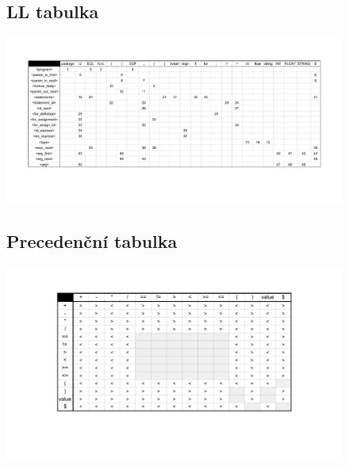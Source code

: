 \documentclass[a4paper, 12pt]{article}
\def\fillandplacepagenumber{%
 \par\pagestyle{empty}%
 \vbox to 0pt{\vss}\vfill
 \vbox to 0pt{\baselineskip0pt
   \hbox to\linewidth{\hss}%
   \baselineskip\footskip
   \hbox to\linewidth{%
     \hfil\thepage\hfil}\vss}}
\begin{document}
\begin{landscape}
\pagestyle{empty}
\begin{figure}[h]
\subsection{LL tabulka}
\hspace*{-3.6cm}\vspace*{+1cm}\includegraphics[width=1.85\textwidth,keepaspectratio]{LL_table.pdf}
\end{figure}
\end{landscape}

\begin{landscape}
\pagestyle{empty}
\begin{figure}[h]
\subsection{Precedenční tabulka}
\hspace*{-3.6cm}\vspace*{+1cm}\includegraphics[width=1.85\textwidth,keepaspectratio]{Precedence_table.pdf}
\end{figure}
\end{landscape}
\end{document}
